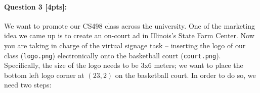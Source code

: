 \documentclass[11pt]{article}
\begin{document}



\paragraph{Question 3 [4pts]:}

We want to promote our CS498 class across the university. One of the marketing idea we came up is to create an on-court ad in Illinois's State Farm Center. Now you are taking in charge of the virtual signage task --  inserting the logo of our class (\texttt{logo.png}) electronically onto the basketball court (\texttt{court.png}). Specifically, the size of the logo needs to be 3x6 meters; we want to place the bottom left logo corner at $(23, 2)$ on the basketball court. In order to do so, we need two steps: 
\end{document}
